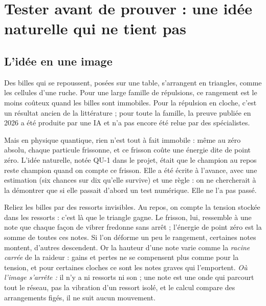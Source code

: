 \chapter[Tester avant de prouver]{Tester avant de prouver : une idée naturelle qui ne tient pas}


\section*{L'idée en une image}

Des billes qui se repoussent, posées sur une table, s'arrangent en triangles, comme les
cellules d'une ruche. Pour une large famille de répulsions, ce rangement est le moins coûteux
quand les billes sont immobiles. Pour la répulsion
en cloche, c'est un résultat ancien de la littérature ; pour toute la famille, la preuve
publiée en 2026 a été produite par une IA et n'a pas encore été relue par des spécialistes.

Mais en physique quantique, rien n'est tout à fait immobile : même au zéro absolu, chaque
particule frissonne, et ce frisson coûte une énergie dite \og de point zéro\fg{}. L'idée
naturelle, notée QU-1 dans le projet, était que le champion au repos reste champion quand on
compte ce frisson. Elle a été écrite à l'avance, avec une estimation (six chances sur dix
qu'elle survive) et une règle : on ne chercherait à la démontrer que si elle passait d'abord
un test numérique. Elle ne l'a pas passé.

\begin{analogie}
Reliez les billes par des ressorts invisibles. Au repos, on compte la tension stockée dans les
ressorts : c'est là que le triangle gagne. Le frisson, lui, ressemble à une note que chaque
façon de vibrer fredonne sans arrêt ; l'énergie de point zéro est la somme de toutes ces
notes. Si l'on déforme un peu le rangement, certaines notes montent, d'autres descendent. Or
la hauteur d'une note varie comme la \emph{racine carrée} de la raideur : gains et pertes ne
se compensent plus comme pour la tension, et pour certaines cloches ce sont les notes graves
qui l'emportent.
\emph{Où l'image s'arrête :} il n'y a ni ressorts ni son ; une \og note\fg{} est une onde qui
parcourt tout le réseau, pas la vibration d'un ressort isolé, et le calcul compare des
arrangements figés, il ne suit aucun mouvement.
\end{analogie}

